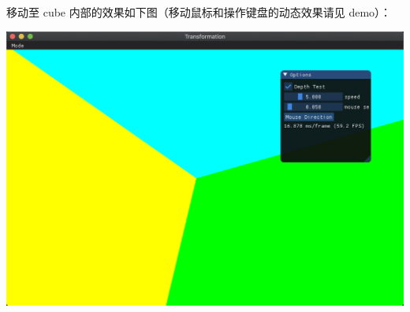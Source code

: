 \documentclass[12pt]{article}
\begin{document}
移动至 cube 内部的效果如下图（移动鼠标和操作键盘的动态效果请见 demo）：
\begin{center}
    \includegraphics[scale=0.35]{camera.png}
\end{center}
\end{document}
